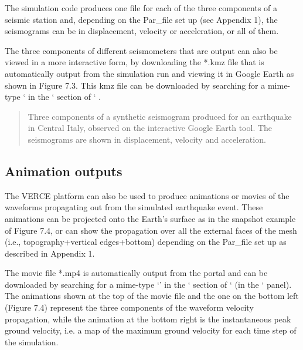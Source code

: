 \documentclass[english]{book}
\begin{document}
The simulation code produces one file for each of the three components
of a seismic station and, depending on the Par\_file set up (see
Appendix 1), the seismograms can be in displacement, velocity or
acceleration, or all of them.

The three components of different seismometers that are output can also
be viewed in a more interactive form, by downloading the *.kmz file
that is automatically output from the simulation run and viewing it in
Google Earth as shown in Figure 7.3. This kmz file can be downloaded by
searching for a mime-type ‘ in the
‘ section of ‘ .
\begin{quote}


 Three components of a synthetic seismogram produced
for an earthquake in Central Italy, observed on the interactive
Google Earth tool. The seismograms are shown in displacement,
velocity and acceleration.
\end{quote}


\subsection{Animation outputs}
\label{\detokenize{Section7:animation-outputs}}
The VERCE platform can also be used to produce animations or movies of
the waveforms propagating out from the simulated earthquake event. These
animations can be projected onto the Earth’s surface as in the snapshot
example of Figure 7.4, or can show the propagation over all the external
faces of the mesh (i.e., topography+vertical edges+bottom) depending on
the Par\_file set up as described in Appendix 1.

The movie file *.mp4 is automatically output from the portal and can be
downloaded by searching for a mime-type
‘’ in the ‘ section of
‘  (in the ‘ panel). The animations shown
at the top of the movie file and the one on the bottom left (Figure 7.4)
represent the three components of the waveform velocity propagation,
while the animation at the bottom right is the instantaneous peak ground
velocity, i.e. a map of the maximum ground velocity for each time step
of the simulation.
\end{document}
